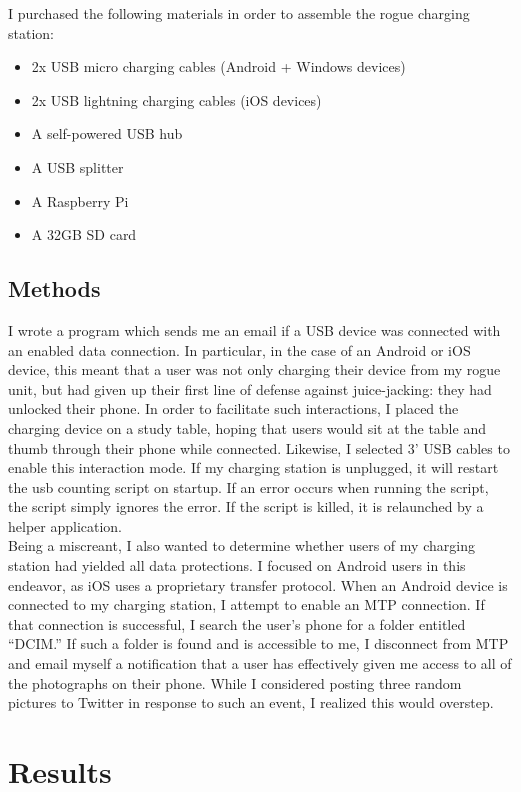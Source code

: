 \documentclass[11pt]{article} %
\begin{document}
I purchased the following materials in order to assemble the rogue charging station: 
\begin{itemize}
\item 2x USB micro charging cables (Android + Windows devices) 
\item 2x USB lightning charging cables (iOS devices) 
\item A self-powered USB hub
\item A USB splitter
\item A Raspberry Pi
\item A 32GB SD card
\end{itemize} 

\subsection{Methods} 

I wrote a program which sends me an email if a USB device was connected with an enabled data connection. In particular, in the case of an Android or iOS device, this meant that a user was not only charging their device from my rogue unit, but had given up their first line of defense against juice-jacking: they had unlocked their phone. In order to facilitate such interactions, I placed the charging device on a study table, hoping that users would sit at the table and thumb through their phone while connected. Likewise, I selected 3' USB cables to enable this interaction mode. If my charging station is unplugged, it will restart the usb counting script on startup. If an error occurs when running the script, the script simply ignores the error. If the script is killed, it is relaunched by a helper application.\\

\noindent Being a miscreant, I also wanted to determine whether users of my charging station had yielded all data protections. I focused on Android users in this endeavor, as iOS uses a proprietary transfer protocol. When an Android device is connected to my charging station, I attempt to enable an MTP connection. If that connection is successful, I search the user's phone for a folder entitled ``DCIM.'' If such a folder is found and is accessible to me, I disconnect from MTP and email myself a notification that a user has effectively given me access to all of the photographs on their phone. While I considered posting three random pictures to Twitter in response to such an event, I realized this would overstep.

\section{Results}
\end{document}
